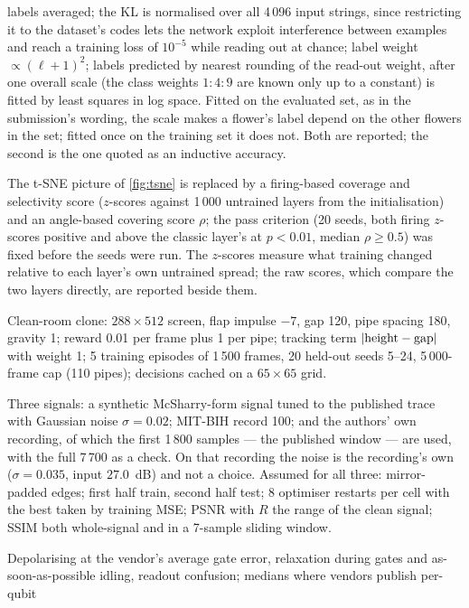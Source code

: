 \begin{description}
labels averaged; the KL is normalised over all 4\,096 input strings, since restricting it to
the dataset's codes lets the network exploit interference between examples and reach a training
loss of $10^{-5}$ while reading out at chance; label weight $\propto(\ell+1)^2$; labels
predicted by nearest rounding of the read-out weight, after one overall scale (the class weights
$1:4:9$ are known only up to a constant) is fitted by least squares in log space.  Fitted on the
evaluated set, as in the submission's wording, the scale makes a flower's label depend on the
other flowers in the set; fitted once on the training set it does not.  Both are reported; the
second is the one quoted as an inductive accuracy.
\item[Weight-picture criterion.]  The t-SNE picture of \cref{fig:tsne} is replaced by a
firing-based coverage and selectivity score ($z$-scores against 1\,000 untrained layers from the
initialisation) and an angle-based covering score $\rho$; the pass criterion (20 seeds, both
firing $z$-scores positive and above the classic layer's at $p<0.01$, median $\rho\ge 0.5$) was
fixed before the seeds were run.  The $z$-scores measure what training changed relative to each
layer's own untrained spread; the raw scores, which compare the two layers directly, are
reported beside them.
\item[Flappy.]  Clean-room clone: $288\times512$ screen, flap impulse $-7$, gap 120, pipe
spacing 180, gravity 1; reward 0.01 per frame plus 1 per pipe; tracking term
$|{\rm height}-{\rm gap}|$ with weight 1; 5 training episodes of 1\,500 frames, 20 held-out
seeds 5--24, 5\,000-frame cap (110 pipes); decisions cached on a $65\times65$ grid.
\item[ECG.]  Three signals: a synthetic McSharry-form signal tuned to the published trace with
Gaussian noise $\sigma=0.02$; MIT-BIH record 100; and the authors' own recording, of which the
first 1\,800 samples --- the published window --- are used, with the full 7\,700 as a
check.  On that recording the noise is the recording's own ($\sigma=0.035$, input
$27.0$~dB) and not a choice.  Assumed for all three: mirror-padded edges; first half train,
second half test; 8 optimiser restarts per cell with the best taken by training MSE; PSNR with
$R$ the range of the clean signal; SSIM both whole-signal and in a 7-sample sliding window.
\item[Noise model.]  Depolarising at the vendor's average gate error, relaxation during gates
and as-soon-as-possible idling, readout confusion; medians where vendors publish per-qubit

\end{description}
